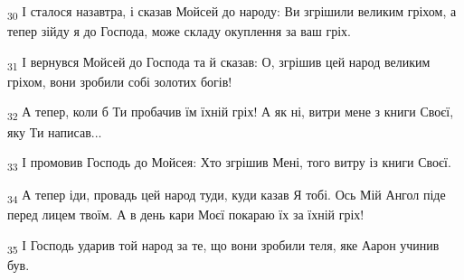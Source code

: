 \begin{tcolorbox}
\textsubscript{30} І сталося назавтра, і сказав Мойсей до народу: Ви згрішили великим гріхом, а тепер зійду я до Господа, може складу окуплення за ваш гріх.
\end{tcolorbox}
\begin{tcolorbox}
\textsubscript{31} І вернувся Мойсей до Господа та й сказав: О, згрішив цей народ великим гріхом, вони зробили собі золотих богів!
\end{tcolorbox}
\begin{tcolorbox}
\textsubscript{32} А тепер, коли б Ти пробачив їм їхній гріх! А як ні, витри мене з книги Своєї, яку Ти написав...
\end{tcolorbox}
\begin{tcolorbox}
\textsubscript{33} І промовив Господь до Мойсея: Хто згрішив Мені, того витру із книги Своєї.
\end{tcolorbox}
\begin{tcolorbox}
\textsubscript{34} А тепер іди, провадь цей народ туди, куди казав Я тобі. Ось Мій Ангол піде перед лицем твоїм. А в день кари Моєї покараю їх за їхній гріх!
\end{tcolorbox}
\begin{tcolorbox}
\textsubscript{35} І Господь ударив той народ за те, що вони зробили теля, яке Аарон учинив був.
\end{tcolorbox}
